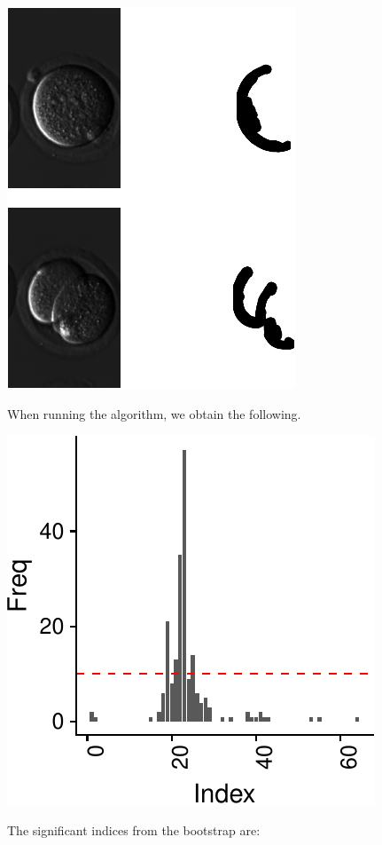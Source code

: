 \documentclass[smallextended]{svjour3}       %
\begin{document}
\begin{center}\includegraphics{springer_template_files/figure-latex/chunk_10_5-1} \end{center}

When running the algorithm, we obtain the following.

\begin{center}\includegraphics{springer_template_files/figure-latex/chunk_11-1} \end{center}

The significant indices from the bootstrap are:
\end{document}
